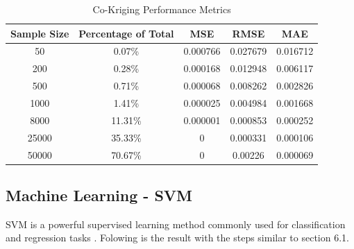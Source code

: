 \documentclass{swmcmthesis}
\begin{document}
\begin{table}[h!]
\centering
\caption{Co-Kriging Performance Metrics}
\label{tab:metrics}
\begin{tabular}{|c|c|c|c|c|}
\hline
\textbf{Sample Size} & \textbf{Percentage of Total} & \textbf{MSE} & \textbf{RMSE} & \textbf{MAE} \\ \hline
50     & 0.07\%  & 0.000766 & 0.027679 & 0.016712 \\ \hline
200    & 0.28\%  & 0.000168 & 0.012948 & 0.006117 \\ \hline
500    & 0.71\%  & 0.000068 & 0.008262 & 0.002826 \\ \hline
1000   & 1.41\%  & 0.000025 & 0.004984 & 0.001668 \\ \hline
8000   & 11.31\% & 0.000001 & 0.000853 & 0.000252 \\ \hline
25000  & 35.33\% & 0 & 0.000331 & 0.000106 \\ \hline
50000  & 70.67\% & 0 & 0.00226  & 0.000069 \\ \hline
\end{tabular}
\end{table}


\subsection{Machine Learning - SVM}
SVM is a powerful supervised learning method commonly used for classification and regression tasks \cite{bib8}. Folowing is the result with the steps similar to section 6.1.
\end{document}
